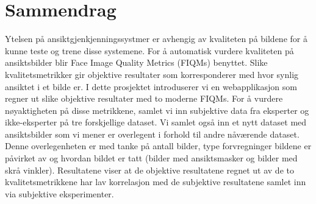 \chapter*{Sammendrag}
Ytelsen på ansiktgjenkjenningssystmer er avhengig av kvaliteten på bildene for å kunne teste og trene disse systemene. For å automatisk vurdere kvaliteten på ansiktsbilder blir Face Image Quality Metrics (FIQMs) benyttet. Slike kvalitetsmetrikker gir objektive resultater som korresponderer med hvor synlig ansiktet i et bilde er. I dette prosjektet introduserer vi en webapplikasjon som regner ut slike objektive resultater med to moderne FIQMs. For å vurdere nøyaktigheten på disse metrikkene, samlet vi inn subjektive data fra eksperter og ikke-eksperter på tre forskjellige dataset. Vi samlet også inn et nytt dataset med ansiktsbilder som vi mener er overlegent i forhold til andre nåværende dataset. Denne overlegenheten er med tanke på antall bilder, type forvregninger bildene er påvirket av og hvordan bildet er tatt (bilder med ansiktsmasker og bilder med skrå vinkler). Resultatene viser at de objektive resultatene regnet ut av de to kvalitetsmetrikkene har lav korrelasjon med de subjektive resultatene samlet inn via subjektive eksperimenter. 

